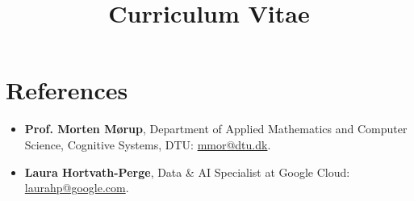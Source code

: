 \documentclass[11pt,a4paper]{moderncv}
\title{Curriculum Vitae}
\begin{document}
\section*{References}

\begin{itemize}
    \item \textbf{Prof. Morten Mørup}, Department of Applied Mathematics and Computer Science, Cognitive Systems, DTU: \href{mailto:mmor@dtu.dk}{mmor@dtu.dk}.
    \item \textbf{Laura Hortvath-Perge}, Data \& AI Specialist at Google Cloud: \href{mailto:laurahp@google.com}{laurahp@google.com}.
\end{itemize}
\end{document}
